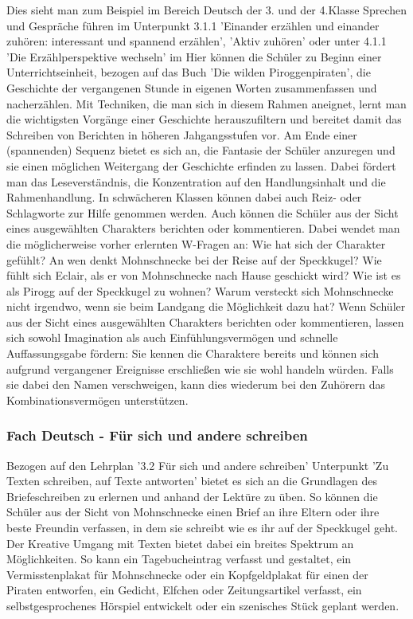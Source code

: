 Dies sieht man zum Beispiel im Bereich Deutsch der 3. und der 4.Klasse Sprechen und Gespräche führen im Unterpunkt 3.1.1 'Einander erzählen und einander zuhören: interessant und spannend erzählen',\cite[S.172]{LP}  'Aktiv zuhören'\cite[S.172]{LP}  oder unter 4.1.1 'Die Erzählperspektive wechseln' \cite[S.246]{LP GS 2000}  im
Hier können die Schüler zu Beginn einer Unterrichtseinheit, bezogen auf das Buch 'Die wilden Piroggenpiraten',\cite{pir} die Geschichte der vergangenen Stunde in eigenen Worten zusammenfassen und nacherzählen. Mit Techniken, die man sich in diesem Rahmen aneignet, lernt man die wichtigsten Vorgänge einer Geschichte herauszufiltern und  bereitet damit das Schreiben von Berichten in höheren Jahgangsstufen vor. 
Am Ende einer (spannenden) Sequenz bietet es sich an, die Fantasie der Schüler anzuregen und sie einen möglichen Weitergang der Geschichte erfinden zu lassen. Dabei fördert man das Leseverständnis, die Konzentration auf den Handlungsinhalt und die Rahmenhandlung. In schwächeren Klassen können dabei auch Reiz- oder Schlagworte zur Hilfe genommen werden. 
Auch können die Schüler aus der Sicht eines ausgewählten Charakters berichten oder kommentieren. Dabei wendet man die möglicherweise vorher erlernten W-Fragen an: Wie hat sich der Charakter gefühlt? An wen denkt Mohnschnecke bei der Reise auf der Speckkugel? Wie fühlt sich Eclair, als er von Mohnschnecke nach Hause geschickt wird? Wie ist es als Pirogg auf der Speckkugel zu wohnen? Warum versteckt sich Mohnschnecke nicht irgendwo, wenn sie beim Landgang die Möglichkeit dazu hat?
Wenn Schüler aus der Sicht eines ausgewählten Charakters berichten oder kommentieren, lassen sich sowohl Imagination als auch Einfühlungsvermögen und schnelle Auffassungsgabe fördern: Sie kennen die Charaktere bereits und können sich aufgrund vergangener Ereignisse erschließen wie sie wohl handeln würden. Falls sie dabei den Namen verschweigen, kann dies wiederum bei den Zuhörern das Kombinationsvermögen unterstützen.

\subsubsection{Fach Deutsch - Für sich und andere schreiben}

Bezogen auf den Lehrplan '3.2 Für sich und andere schreiben' Unterpunkt 'Zu Texten schreiben, auf Texte antworten' \cite[S.174]{LP}  bietet es sich an die Grundlagen des Briefeschreiben zu erlernen und anhand der Lektüre zu üben. So können die Schüler aus der Sicht von Mohnschnecke einen Brief an ihre Eltern oder ihre beste Freundin verfassen, in dem sie schreibt wie es ihr auf der Speckkugel geht. Der Kreative Umgang mit Texten bietet dabei ein breites Spektrum an Möglichkeiten. So kann ein Tagebucheintrag verfasst und gestaltet, ein Vermisstenplakat für Mohnschnecke oder ein Kopfgeldplakat für einen der Piraten entworfen, ein Gedicht, Elfchen oder Zeitungsartikel verfasst, ein selbstgesprochenes Hörspiel entwickelt oder ein szenisches Stück geplant werden.

